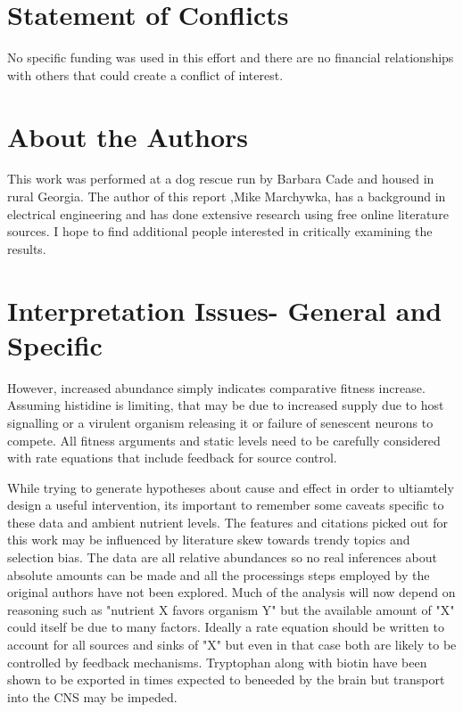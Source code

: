 \documentclass[aps,secnumarabic,balancelastpage,amsmath,amssymb,nofootinbib]{revtex4}
\begin{document}
\clearpage
\appendix


\section{ Statement of Conflicts }
 No specific funding was used in this effort and there are no financial
relationships with others that could create a conflict of interest. 

\section{About the Authors}
This work was performed at a dog rescue run by Barbara Cade and
housed in rural Georgia.  The author of this report 
,Mike Marchywka,
has a background in electrical engineering and 
has done extensive research using free online literature sources.  
I hope to find additional people interested in critically 
examining the results.

\section{Interpretation Issues- General and Specific }
\label{appendix:interp}


However, increased abundance simply indicates comparative fitness
increase. Assuming histidine is limiting, that may be due to
increased supply due to host signalling or a virulent
organism releasing it or failure of senescent neurons to 
compete. All fitness arguments and static levels need to
be carefully considered with rate equations that include
feedback for source control.  

While trying to generate hypotheses about cause and effect
in order to ultiamtely design a useful intervention, its
important to remember some caveats specific to these data
and ambient nutrient levels. 
The features and citations picked out for this work may be
influenced by literature skew towards trendy topics and
selection bias. 
The data are all relative
abundances so no real inferences about absolute
amounts can be made and all the processings
steps employed by the original authors have not been
explored. Much of the analysis will now depend
on reasoning such as "nutrient X favors organism Y"
but the available amount of "X" could itself be
due to many factors. Ideally a rate equation
should be written to account for all sources and sinks
of "X" but even in that case both are likely to be
controlled by feedback mechanisms. Tryptophan along
with biotin have been shown to be exported in
times expected to beneeded by the brain but
transport into the CNS may be impeded. 
\end{document}
